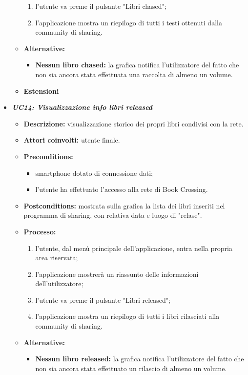 \begin{itemize}
\begin{itemize}
\begin{enumerate}
			\item l'utente va preme il pulsante "Libri chased";
			\item l'applicazione mostra un riepilogo di tutti i testi ottenuti dalla community di sharing.
		\end{enumerate}
		\item \textbf{Alternative:}
		\begin{itemize}
			\item \textbf{Nessun libro chased:} la grafica notifica l'utilizzatore del fatto che non sia ancora stata effettuata una raccolta di almeno un volume.
		\end{itemize}
		\item \textbf{Estensioni}
	\end{itemize}
	\item \textbf{\textit{UC14: Visualizzazione info libri released}}
	\begin{itemize}
		\item \textbf{Descrizione:} visualizzazione storico dei propri libri condivisi con la rete.
		\item \textbf{Attori coinvolti:}  utente finale.
		\item \textbf{Preconditions:}
		\begin{itemize}
			\item smartphone dotato di connessione dati;
			\item l’utente ha effettuato l’accesso alla rete di Book Crossing.
		\end{itemize}
		\item \textbf{Postconditions:} mostrata sulla grafica la lista dei libri inseriti nel programma di sharing, con relativa data e luogo di "relase".
		\item \textbf{Processo:}
		\begin{enumerate}
			\item l'utente, dal menù principale dell'applicazione, entra nella propria area riservata;
			\item l'applicazione mostrerà un riassunto delle informazioni dell'utilizzatore;
			\item l'utente va preme il pulsante "Libri released";
			\item l'applicazione mostra un riepilogo di tutti i libri rilasciati alla community di sharing.
		\end{enumerate}
		\item \textbf{Alternative:}
		\begin{itemize}
			\item \textbf{Nessun libro released:} la grafica notifica l'utilizzatore del fatto che non sia ancora stata effettuato un rilascio di almeno un volume.

\end{itemize}
\end{itemize}
\end{itemize}
